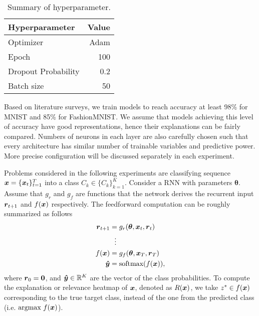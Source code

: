 \begin{table}[!htb]
\centering
\begin{tabular}{l|r}
\textbf{Hyperparameter} & \multicolumn{1}{l}{\textbf{Value}} \\ \hline
Optimizer               & Adam                               \\
Epoch     & 100                                \\
Dropout Probability     & 0.2                               \\
Batch size              & 50                                
\end{tabular}
\caption{Summary of hyperparameter.}
\label{tab:hyper_summary}
\end{table}



  Based on literature surveys, we train models to reach accuracy at least  98\% for MNIST and 85\% for FashionMNIST.  We assume that models achieving this level of accuracy have good representations, hence their explanations can be fairly compared. Numbers of neurons in each layer are also carefully chosen such that every architecture has similar number of trainable variables and predictive power.  More precise configuration will be discussed separately in each experiment. 

Problems considered in the following experiments are classifying sequence $\boldsymbol{x}= \{ \boldsymbol{x}_t \}_{t=1}^T$ into a class $C_k \in \{ C_k \}_{k=1}^K$. Consider a RNN with parameters $\boldsymbol{\theta}$. Assume that $g_r$ and $g_{f}$ are functions that the network derives the recurrent input $\patvector{r}_{t+1}$ and $f(\boldsymbol{x})$ respectively. The feedforward computation can be roughly summarized as follows
 \begin{align}
 	\patvector{r}_{t+1} &= g_r(\patvector{\theta}, \patvector{x}_t, \patvector{r}_t) \\
 	 &\ \ \vdots\\
f(\x) &= g_{f}(\patvector{\theta}, \patvector{x}_{T},  \patvector{r}_{T}) \\
 	\patvector{\hat{y}} &= \text{softmax}(f(\x)),
 \end{align}
 where $\patvector{r}_0 = \patvector{0}$, and $\patvector{\hat{y}} \in \mathbb{R}^K$ are the vector of the class probabilities. To compute the explanation or relevance heatmap of $\boldsymbol{x}$, denoted as $R(\boldsymbol{x})$, we take $z^* \in f(\boldsymbol{x})$ corresponding to the true target class, instead of the one from the predicted class (i.e. $\underset{}{\text{argmax}}\  f(\boldsymbol{x})$).  
 
